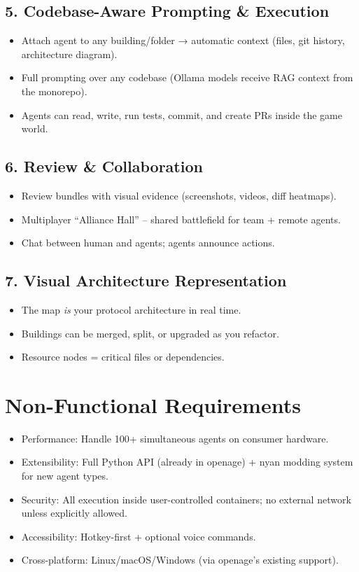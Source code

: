 \documentclass[11pt,a4paper]{article}
\begin{document}
\subsection{5. Codebase-Aware Prompting \& Execution}
\begin{itemize}
    \item Attach agent to any building/folder → automatic context (files, git history, architecture diagram).
    \item Full prompting over any codebase (Ollama models receive RAG context from the monorepo).
    \item Agents can read, write, run tests, commit, and create PRs inside the game world.
\end{itemize}

\subsection{6. Review \& Collaboration}
\begin{itemize}
    \item Review bundles with visual evidence (screenshots, videos, diff heatmaps).
    \item Multiplayer ``Alliance Hall'' – shared battlefield for team + remote agents.
    \item Chat between human and agents; agents announce actions.
\end{itemize}

\subsection{7. Visual Architecture Representation}
\begin{itemize}
    \item The map \emph{is} your protocol architecture in real time.
    \item Buildings can be merged, split, or upgraded as you refactor.
    \item Resource nodes = critical files or dependencies.
\end{itemize}

\section{Non-Functional Requirements}
\begin{itemize}
    \item Performance: Handle 100+ simultaneous agents on consumer hardware.
    \item Extensibility: Full Python API (already in openage) + nyan modding system for new agent types.
    \item Security: All execution inside user-controlled containers; no external network unless explicitly allowed.
    \item Accessibility: Hotkey-first + optional voice commands.
    \item Cross-platform: Linux/macOS/Windows (via openage's existing support).
\end{itemize}
\end{document}
